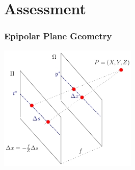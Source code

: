 \documentclass[12pt, compress]{beamer}
\begin{document}
\section{Assessment}

\begin{frame}[fragile]
	\frametitle{Epipolar Plane Geometry}
	\begin{center}
		\includegraphics[height = 6cm]{images/lf_geometry.jpg}
	\end{center}
\end{frame}
\end{document}
